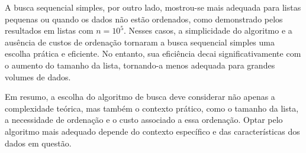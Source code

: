 \documentclass[12pt]{article}
\begin{document}
    A busca sequencial simples, por outro lado, mostrou-se mais adequada para listas pequenas ou quando os dados não estão ordenados, como demonstrado pelos resultados em listas com \(n = 10^5\). Nesses casos, a simplicidade do algoritmo e a ausência de custos de ordenação tornaram a busca sequencial simples uma escolha prática e eficiente. No entanto, sua eficiência decai significativamente com o aumento do tamanho da lista, tornando-a menos adequada para grandes volumes de dados.
    
    Em resumo, a escolha do algoritmo de busca deve considerar não apenas a complexidade teórica, mas também o contexto prático, como o tamanho da lista, a necessidade de ordenação e o custo associado a essa ordenação. Optar pelo algoritmo mais adequado depende do contexto específico e das características dos dados em questão.




\end{document}

